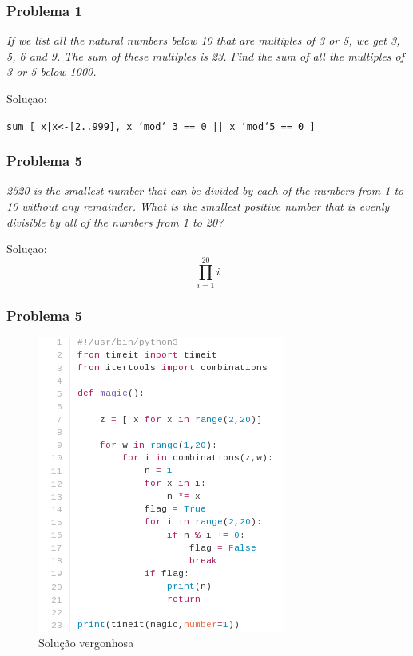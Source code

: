 \documentclass{beamer}
\begin{document}
\begin{frame}
    \frametitle{Problema 1}
    \begin{center}
        \textit{
            If we list all the natural numbers below 10 that are multiples of 3 or 5, we get 3, 5, 6 and 9. The sum of these multiples is 23.
            Find the sum of all the multiples of 3 or 5 below 1000.
        }
    \end{center}

    Soluçao:
    \begin{center}
        \texttt{sum [ x|x<-[2..999], x `mod` 3 == 0 || x `mod`5 == 0 ]}
    \end{center}

\end{frame}

\begin{frame}
    \frametitle{Problema 5}

    \begin{center}
        \textit{
            2520 is the smallest number that can be divided by each of the numbers from 1 to 10 without any remainder.
            What is the smallest positive number that is evenly divisible by all of the numbers from 1 to 20?
        }
    \end{center}

    Soluçao:
    \begin{equation}
        \prod_{i=1}^{20} i
    \end{equation}
\end{frame}

\begin{frame}
    \frametitle{Problema 5}

    \begin{figure}[htpb]
        \centering
        \includegraphics[width=0.4\linewidth]{images/prob5.png}
        \caption{Solução vergonhosa}
    \end{figure}

\end{frame}
\end{document}
